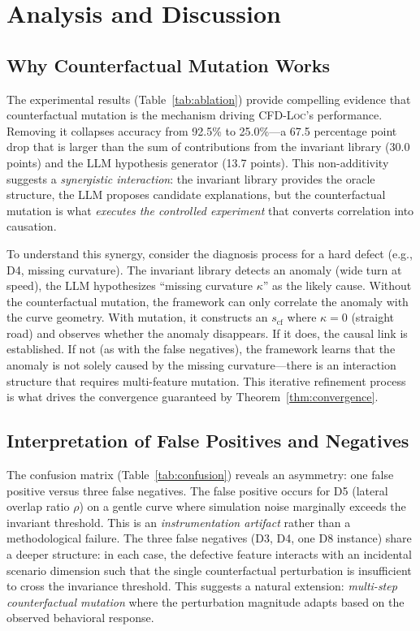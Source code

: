 \documentclass[journal]{IEEEtran}
\theoremstyle{plain}
\newcommand{\methodname}{\textsc{CFD-Loc}}
\begin{document}
\section{Analysis and Discussion}

\subsection{Why Counterfactual Mutation Works}

The experimental results (Table~\ref{tab:ablation}) provide compelling evidence that counterfactual mutation is the mechanism driving \methodname's performance. Removing it collapses accuracy from 92.5\% to 25.0\%---a 67.5 percentage point drop that is larger than the sum of contributions from the invariant library (30.0 points) and the LLM hypothesis generator (13.7 points). This non-additivity suggests a \emph{synergistic interaction}: the invariant library provides the oracle structure, the LLM proposes candidate explanations, but the counterfactual mutation is what \emph{executes the controlled experiment} that converts correlation into causation.

To understand this synergy, consider the diagnosis process for a hard defect (e.g., D4, missing curvature). The invariant library detects an anomaly (wide turn at speed), the LLM hypothesizes ``missing curvature $\kappa$'' as the likely cause. Without the counterfactual mutation, the framework can only correlate the anomaly with the curve geometry. With mutation, it constructs an $s_{\text{cf}}$ where $\kappa=0$ (straight road) and observes whether the anomaly disappears. If it does, the causal link is established. If not (as with the false negatives), the framework learns that the anomaly is not solely caused by the missing curvature---there is an interaction structure that requires multi-feature mutation. This iterative refinement process is what drives the convergence guaranteed by Theorem~\ref{thm:convergence}.

\subsection{Interpretation of False Positives and Negatives}

The confusion matrix (Table~\ref{tab:confusion}) reveals an asymmetry: one false positive versus three false negatives. The false positive occurs for D5 (lateral overlap ratio $\rho$) on a gentle curve where simulation noise marginally exceeds the invariant threshold. This is an \emph{instrumentation artifact} rather than a methodological failure. The three false negatives (D3, D4, one D8 instance) share a deeper structure: in each case, the defective feature interacts with an incidental scenario dimension such that the single counterfactual perturbation is insufficient to cross the invariance threshold. This suggests a natural extension: \emph{multi-step counterfactual mutation} where the perturbation magnitude adapts based on the observed behavioral response.
\end{document}
